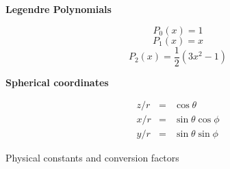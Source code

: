 \documentclass[11pt]{article}
\begin{document}
\begin{multicols}{2}
{\bf Legendre Polynomials}

\begin{equation}
P_0(x) = 1
\end{equation}
\begin{equation}
P_1(x) = x
\end{equation}
\begin{equation}
P_2(x) = \frac{1}{2} (3x^2-1)
\end{equation}

{\bf Spherical coordinates}

\begin{eqnarray}
z/r & = & \cos \theta \\
x/r & = & \sin \theta \cos \phi \\
y/r & = & \sin \theta \sin \phi
\end{eqnarray}

\end{multicols}

\pagebreak

{\large \centerline{Physical constants and conversion factors}}
\def\npar{\par\medskip}
\def\vvec#1{\vec{#1}\,}
\def\rr{\vec{r}}
\def\vv{\vec{v}}
\def\aaa{\vec{a}}
\def\e#1{\vec{e}_{\rm #1}}
\def\ee#1{\vec{e}_{#1}}
\def\Q#1#2{\frac{\partial #1}{\partial #2}}
\def\QQ#1#2{\frac{\partial^2 #1}{\partial #2^2}}
\def\Qc#1#2#3{\left(\frac{\partial #1}{\partial #2}\right)_{#3}}
\def\LL{{\cal L}}
\def\RR{I\hspace{-1mm}R}
\def\NN{I\hspace{-1mm}N}
\def\TT{\mbox{\sfd T}}
\def\DD{\mbox{\sfd D}}
\def\half{\mbox{$\frac{1}{2}$}}
\def\kwart{\mbox{$\frac{1}{4}$}}
\def\av#1{\left\langle #1 \right\rangle}
\def\oiint{\int\hspace{-2ex}\int\hspace{-3ex}\bigcirc~}
\def\iint{\int\hspace{-1.5ex}\int}
\def\iiint{\int\hspace{-1.5ex}\int\hspace{-1.5ex}\int}
\def\dd{d\hspace{-1ex}\rule[1.25ex]{2mm}{0.4pt}}
\def\lrarrow{~\lower.2ex\hbox{$\rightarrow$}\kern-2.4ex\raise.7ex\hbox{$\leftarrow$}~}
\def\rlarrow{~\lower.2ex\hbox{$\leftarrow$}\kern-2.3ex\raise.7ex\hbox{$\rightarrow$}~}
\def\ne{n_{\rm e}}
\def\ni{n_{\rm i}}
\def\no{n_{\rm 0}}
\def\me{m_{\rm e}}
\def\mi{m_{\rm i}}
\def\Te{T_{\rm e}}
\def\Ti{T_{\rm i}}
\end{document}
